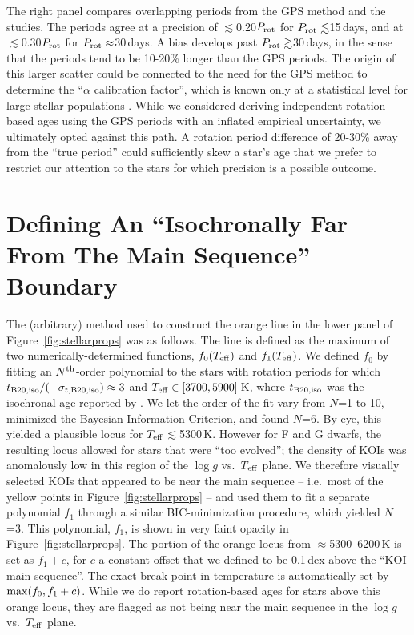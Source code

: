 \documentclass[11pt,twocolumn,tighten,linenumbers]{aastex63}
\begin{document}
The right panel compares overlapping periods from the
\citet{Reinhold2023} GPS method and the \citeauthor{Santos_2021} studies.  The
periods agree at a precision of $\lesssim$0.20$P_{\rm rot}$ for
$P_{\rm rot}\lesssim$15\,days, and at $\lesssim$0.30$P_{\rm rot}$ for
$P_{\rm rot}\approx$30\,days.  A  bias develops past $P_{\rm
rot}\gtrsim$30\,days, in the sense that the \citeauthor{Santos_2021}
periods tend to be 10-20\% longer than the GPS periods.  The origin of
this larger scatter could be connected to the need for the GPS method
to determine the ``$\alpha$ calibration factor'', which is known only
at a statistical level for large stellar populations
\citep[see][]{Reinhold2023}.  While we considered deriving independent
rotation-based ages using the \citet{Reinhold2023} GPS periods with an
inflated empirical uncertainty, we ultimately opted against this path.
A rotation period difference of 20-30\% away from the ``true period''
could sufficiently skew a star's age that we prefer to restrict our
attention to the stars for which precision is a possible
outcome.





\section{Defining An ``Isochronally Far From The Main Sequence'' Boundary}
\label{app:linemethod}

The (arbitrary) method used to construct the orange line in 
the lower panel of Figure~\ref{fig:stellarprops} was as follows.
The line is	defined as
the maximum of two numerically-determined functions, $f_0(T_{\rm eff})$ and $f_1(T_{\rm eff})$.
We defined $f_0$ by fitting an
$N^{\rm th}$-order polynomial to the stars with rotation periods for which $t_{\rm
	B20,iso}/(+\sigma_{t,{\rm B20,iso}})\approx 3$
and $T_{\rm eff}\in[3700,5900]$\,K, where
$t_{\rm B20,iso}$ was the isochronal age reported by
\citet{Berger_2020a_catalog}.  We let the order of the fit vary from
$N$=1 to 10, minimized the Bayesian Information Criterion,
and found $N$=6.  
By eye, this yielded a plausible locus for $T_{\rm eff}$$\lesssim$5300\,K.
However for F and G dwarfs, the resulting locus
allowed for stars that were ``too evolved''; the density of KOIs 
was anomalously low in this region of the $\log g$ vs.\ $T$$_{\rm eff}$ plane.
We therefore visually selected KOIs that appeared
to be near the main sequence -- i.e.~most of the yellow
points in Figure~\ref{fig:stellarprops} -- and used them to fit a separate
polynomial $f_1$ through a similar BIC-minimization procedure,
which yielded $N$=3.
This polynomial, $f_1$, is shown in very faint opacity in Figure~\ref{fig:stellarprops}.
The portion of the orange locus from $\approx$5300--6200\,K
is set as $f_1 + c$, for $c$ a constant offset that we defined to be
0.1\,dex above the ``KOI main sequence''.
The exact break-point in temperature is automatically set by ${\rm max}(f_0, f_1+c)$.
While we do report rotation-based ages for stars
above this orange locus,
they are flagged as not being near the main sequence in the $\log g$ vs.~$T_{\rm eff}$ plane. 
\end{document}
